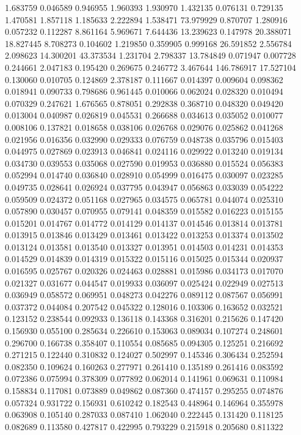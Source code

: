 1.683759
0.046589
0.946955
1.960393
1.930970
1.432135
0.076131
0.729135
1.470581
1.857118
1.185633
2.222894
1.538471
73.979929
0.870707
1.280916
0.057232
0.112287
8.861164
5.969671
7.644436
13.239623
0.147978
20.388071
18.827445
8.708273
0.104602
1.219850
0.359905
0.999168
26.591852
2.556784
2.098623
14.300201
43.373534
1.231704
2.798337
13.784849
0.071947
0.007728
0.244661
2.047183
0.195420
0.269675
0.246772
3.467644
146.786917
17.527104
0.130060
0.010705
0.124869
2.378187
0.111667
0.014397
0.009604
0.098362
0.018941
0.090733
0.798686
0.961445
0.010066
0.062024
0.028320
0.010494
0.070329
0.247621
1.676565
0.878051
0.292838
0.368710
0.048320
0.049420
0.013004
0.040987
0.026819
0.045531
0.266688
0.034613
0.035052
0.010077
0.008106
0.137821
0.018658
0.038106
0.026768
0.029076
0.025862
0.041268
0.021956
0.016356
0.032990
0.029333
0.076759
0.048738
0.035796
0.015403
0.044975
0.027869
0.023913
0.046841
0.024116
0.029922
0.013240
0.019134
0.034730
0.039553
0.035068
0.027590
0.019953
0.036880
0.015524
0.056383
0.052994
0.014740
0.036840
0.028910
0.054999
0.016475
0.030097
0.023285
0.049735
0.028641
0.026924
0.037795
0.043947
0.056863
0.033039
0.054222
0.059509
0.024372
0.051168
0.027965
0.034575
0.065781
0.044074
0.025310
0.057890
0.030457
0.070955
0.079141
0.048359
0.015582
0.016223
0.015155
0.015201
0.014767
0.014772
0.014129
0.014137
0.014546
0.013814
0.013781
0.013915
0.013846
0.013429
0.013461
0.013422
0.013253
0.013374
0.013502
0.013124
0.013581
0.013540
0.013327
0.013951
0.014503
0.014231
0.014353
0.014529
0.014839
0.014319
0.015322
0.015116
0.015025
0.015344
0.020937
0.016595
0.025767
0.020326
0.024463
0.028881
0.015986
0.034173
0.017070
0.021327
0.031677
0.044547
0.019933
0.036097
0.025424
0.022949
0.027513
0.036949
0.058572
0.069951
0.048273
0.042276
0.089112
0.087567
0.056991
0.037372
0.044084
0.207542
0.045322
0.128016
0.103306
0.163652
0.032521
0.123152
0.238544
0.092933
0.136118
0.143368
0.316201
0.215626
0.147420
0.156930
0.055100
0.285634
0.226610
0.153063
0.089034
0.107274
0.248601
0.296700
0.166738
0.358407
0.110554
0.085685
0.094305
0.125251
0.216692
0.271215
0.122440
0.310832
0.124027
0.502997
0.145346
0.306434
0.252594
0.082350
0.109624
0.160263
0.277971
0.261410
0.135189
0.261416
0.083592
0.072386
0.075994
0.378309
0.077892
0.062014
0.141961
0.069631
0.110984
0.158834
0.117081
0.073889
0.049862
0.087360
0.474157
0.295255
0.074876
0.057324
0.931722
0.156931
0.610242
0.182543
0.448964
0.146964
0.355978
0.063908
0.105140
0.287033
0.087410
1.062040
0.222445
0.131420
0.118125
0.082689
0.113580
0.427817
0.422995
0.793229
0.215918
0.205680
0.811322
